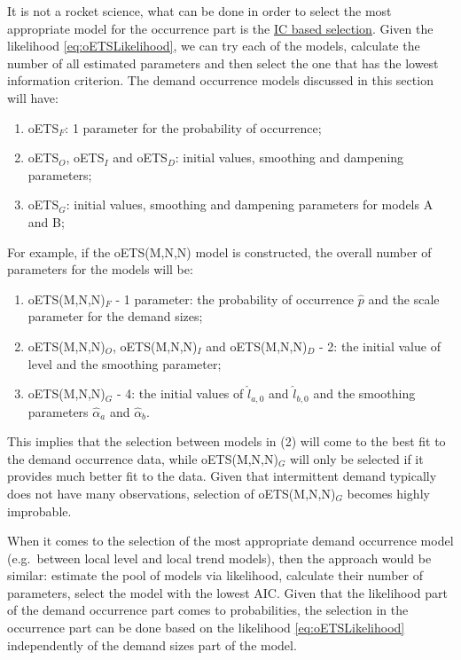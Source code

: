 \documentclass[
]{book}
\providecommand{\tightlist}{%
  \setlength{\itemsep}{0pt}\setlength{\parskip}{0pt}}
\theoremstyle{definition}
\theoremstyle{definition}
\theoremstyle{definition}
\theoremstyle{definition}
\theoremstyle{remark}
\begin{document}
It is not a rocket science, what can be done in order to select the most appropriate model for the occurrence part is the \protect\hyperlink{informationCriteria}{IC based selection}. Given the likelihood \eqref{eq:oETSLikelihood}, we can try each of the models, calculate the number of all estimated parameters and then select the one that has the lowest information criterion. The demand occurrence models discussed in this section will have:

\begin{enumerate}
\def\labelenumi{\arabic{enumi}.}
\tightlist
\item
  oETS\(_F\): 1 parameter for the probability of occurrence;
\item
  oETS\(_O\), oETS\(_I\) and oETS\(_D\): initial values, smoothing and dampening parameters;
\item
  oETS\(_G\): initial values, smoothing and dampening parameters for models A and B;
\end{enumerate}

For example, if the oETS(M,N,N) model is constructed, the overall number of parameters for the models will be:

\begin{enumerate}
\def\labelenumi{\arabic{enumi}.}
\tightlist
\item
  oETS(M,N,N)\(_F\) - 1 parameter: the probability of occurrence \(\hat{p}\) and the scale parameter for the demand sizes;
\item
  oETS(M,N,N)\(_O\), oETS(M,N,N)\(_I\) and oETS(M,N,N)\(_D\) - 2: the initial value of level and the smoothing parameter;
\item
  oETS(M,N,N)\(_G\) - 4: the initial values of \(\hat{l}_{a,0}\) and \(\hat{l}_{b,0}\) and the smoothing parameters \(\hat{\alpha}_a\) and \(\hat{\alpha}_b\).
\end{enumerate}

This implies that the selection between models in (2) will come to the best fit to the demand occurrence data, while oETS(M,N,N)\(_G\) will only be selected if it provides much better fit to the data. Given that intermittent demand typically does not have many observations, selection of oETS(M,N,N)\(_G\) becomes highly improbable.

When it comes to the selection of the most appropriate demand occurrence model (e.g.~between local level and local trend models), then the approach would be similar: estimate the pool of models via likelihood, calculate their number of parameters, select the model with the lowest AIC. Given that the likelihood part of the demand occurrence part comes to probabilities, the selection in the occurrence part can be done based on the likelihood \eqref{eq:oETSLikelihood} independently of the demand sizes part of the model.
\end{document}
